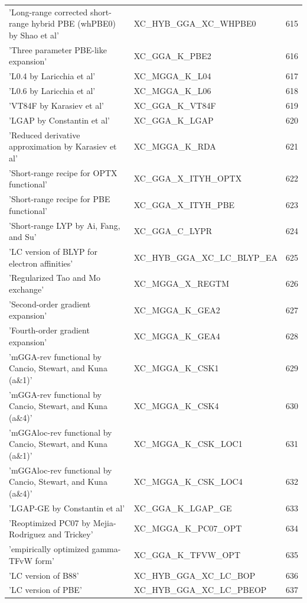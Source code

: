 \documentclass[final,12pt,makeidx,DIV=calc]{article}
\begin{document}
{{{{{{\begin{table}[!h]
\begin{center}
\begin{tabular}{llr}
  'Long-range corrected short-range hybrid PBE (whPBE0) by Shao et al' & XC\_HYB\_GGA\_XC\_WHPBE0  &615\\
  'Three parameter PBE-like expansion' & XC\_GGA\_K\_PBE2  &616\\
  'L0.4 by Laricchia et al' & XC\_MGGA\_K\_L04  &617\\
  'L0.6 by Laricchia et al' & XC\_MGGA\_K\_L06  &618\\
  'VT84F by Karasiev et al' & XC\_GGA\_K\_VT84F  &619\\
  'LGAP by Constantin et al' & XC\_GGA\_K\_LGAP  &620\\
  'Reduced derivative approximation by Karasiev et al' & XC\_MGGA\_K\_RDA  &621\\
  'Short-range recipe for OPTX functional' & XC\_GGA\_X\_ITYH\_OPTX  &622\\
  'Short-range recipe for PBE functional' & XC\_GGA\_X\_ITYH\_PBE  &623\\
  'Short-range LYP by Ai, Fang, and Su' & XC\_GGA\_C\_LYPR  &624\\
  'LC version of BLYP for electron affinities' & XC\_HYB\_GGA\_XC\_LC\_BLYP\_EA  &625\\
  'Regularized Tao and Mo exchange' & XC\_MGGA\_X\_REGTM  &626\\
  'Second-order gradient expansion' & XC\_MGGA\_K\_GEA2  &627\\
  'Fourth-order gradient expansion' & XC\_MGGA\_K\_GEA4  &628\\
  'mGGA-rev functional by Cancio, Stewart, and Kuna (a\&1)' & XC\_MGGA\_K\_CSK1  &629\\
  'mGGA-rev functional by Cancio, Stewart, and Kuna (a\&4)' & XC\_MGGA\_K\_CSK4  &630\\
  'mGGAloc-rev functional by Cancio, Stewart, and Kuna (a\&1)' & XC\_MGGA\_K\_CSK\_LOC1  &631\\
  'mGGAloc-rev functional by Cancio, Stewart, and Kuna (a\&4)' & XC\_MGGA\_K\_CSK\_LOC4  &632\\
  'LGAP-GE by Constantin et al' & XC\_GGA\_K\_LGAP\_GE  &633\\
  'Reoptimized PC07 by Mejia-Rodriguez and Trickey' & XC\_MGGA\_K\_PC07\_OPT  &634\\
  'empirically optimized gamma-TFvW form' & XC\_GGA\_K\_TFVW\_OPT  &635\\
  'LC version of B88' & XC\_HYB\_GGA\_XC\_LC\_BOP  &636\\
  'LC version of PBE' & XC\_HYB\_GGA\_XC\_LC\_PBEOP  &637\\

\end{tabular}
\end{center}
\end{table}}}}}}}
\end{document}

